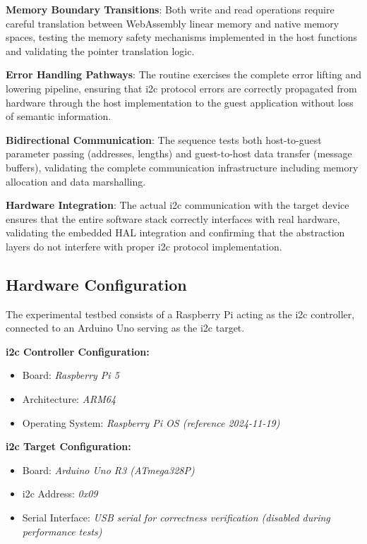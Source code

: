 \textbf{Memory Boundary Transitions}: Both write and read operations require careful translation between WebAssembly linear memory and native memory spaces, testing the memory safety mechanisms implemented in the host functions and validating the pointer translation logic.

\textbf{Error Handling Pathways}: The routine exercises the complete error lifting and lowering pipeline, ensuring that \acrshort{i2c} protocol errors are correctly propagated from hardware through the host implementation to the guest application without loss of semantic information.

\textbf{Bidirectional Communication}: The sequence tests both host-to-guest parameter passing (addresses, lengths) and guest-to-host data transfer (message buffers), validating the complete communication infrastructure including memory allocation and data marshalling.

\textbf{Hardware Integration}: The actual \acrshort{i2c} communication with the target device ensures that the entire software stack correctly interfaces with real hardware, validating the embedded HAL integration and confirming that the abstraction layers do not interfere with proper \acrshort{i2c} protocol implementation.

\subsection{Hardware Configuration}
\label{subsec:eval-setup-hw}

The experimental testbed consists of a Raspberry Pi acting as the \acrshort{i2c} controller, connected to an Arduino Uno serving as the \acrshort{i2c} target.

\textbf{\acrshort{i2c} Controller Configuration:}
\begin{itemize}
    \item Board: \textit{Raspberry Pi 5}~\cite{rpi5_specs}
    \item Architecture: \textit{ARM64}
    \item Operating System: \textit{Raspberry Pi OS (reference 2024-11-19)}~\cite{pi_os}
\end{itemize}

\textbf{\acrshort{i2c} Target Configuration:}
\begin{itemize}
    \item Board: \textit{Arduino Uno R3 (ATmega328P)}~\cite{uno_specs}
    \item \acrshort{i2c} Address: \textit{0x09}
    \item Serial Interface: \textit{USB serial for correctness verification (disabled during performance tests)}
\end{itemize}

